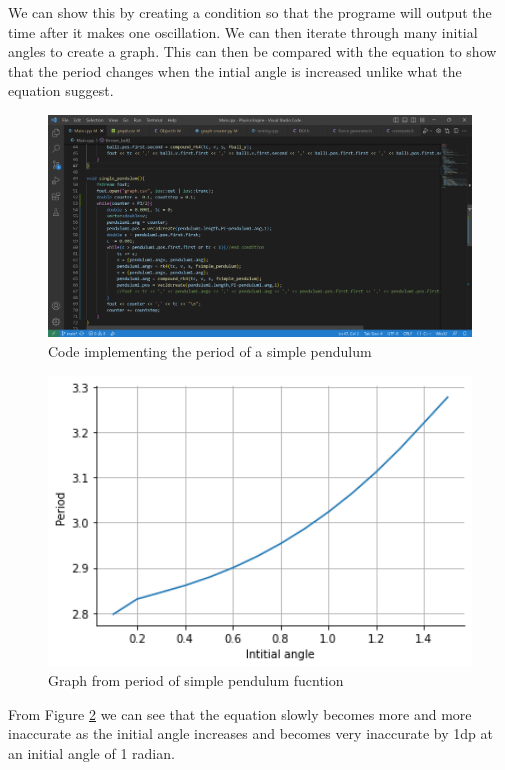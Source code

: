 \documentclass[12pt, a2paper]{article}
\begin{document}
We can show this by creating a condition so that the programe will output the time after it makes one oscillation. We can then iterate through many initial angles to create a graph. This can then be compared with the equation to show that the period changes when the intial angle is increased unlike what the equation suggest.
\begin{figure}[h]
\center
\includegraphics[width=1\textwidth]{Period of pendulum function}
\caption{Code implementing the period of a simple pendulum}
\label{fig 5}
\end{figure}
\begin{figure}[h]
\center
\includegraphics[width=1\textwidth]{Period of pendulum graph}
\caption{Graph from period of simple pendulum fucntion}
\label{Graph 4}
\end{figure}

From Figure \ref{Graph 4} we can see that the equation slowly becomes more and more inaccurate as the initial angle increases and becomes very inaccurate by 1dp at an initial angle of 1 radian.
\end{document}
